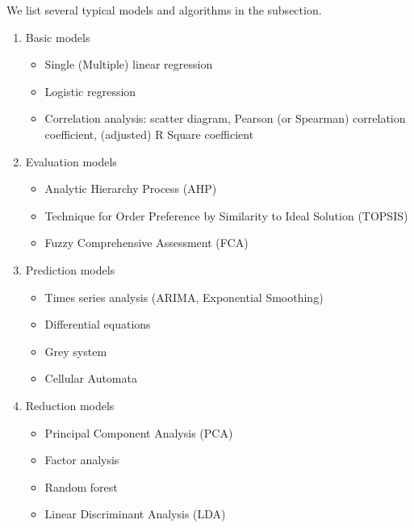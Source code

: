\documentclass[12pt]{article}  %
\begin{document}
 We list several typical models and algorithms in the subsection.
 
 \begin{enumerate}[(1)]
     \item Basic models
     \begin{itemize}
         \setlength{\parsep}{0ex} %
         \setlength{\topsep}{2ex} %
         \setlength{\itemsep}{1ex} %
         \item Single (Multiple) linear regression
         \item Logistic regression
         \item Correlation analysis: scatter diagram, Pearson (or Spearman) correlation coefficient, (adjusted) R Square coefficient
     \end{itemize}
     \item Evaluation models
         \begin{itemize}
         \setlength{\parsep}{0ex} %
         \setlength{\topsep}{2ex} %
         \setlength{\itemsep}{1ex} %
         \item Analytic Hierarchy Process (AHP)
         \item Technique for Order Preference by Similarity to Ideal Solution (TOPSIS)
         \item Fuzzy Comprehensive Assessment (FCA)
     \end{itemize}
     \item Prediction models
     \begin{itemize}
     \setlength{\parsep}{0ex} %
     \setlength{\topsep}{2ex} %
     \setlength{\itemsep}{1ex} %
     \item Times series analysis (ARIMA, Exponential Smoothing)
     \item Differential equations
     \item Grey system
     \item Cellular Automata
 \end{itemize}
 \item Reduction models
     \begin{itemize}
     \setlength{\parsep}{0ex} %
     \setlength{\topsep}{2ex} %
     \setlength{\itemsep}{1ex} %
     \item Principal Component Analysis (PCA)
     \item Factor analysis
     \item Random forest
     \item Linear Discriminant Analysis (LDA)

\end{itemize}
\end{enumerate}
\end{document}
